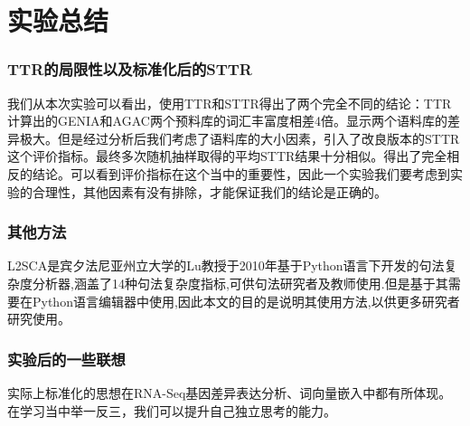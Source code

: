 \documentclass{article}
\begin{document}
\section{实验总结}
\subsubsection{TTR的局限性以及标准化后的STTR}
我们从本次实验可以看出，使用TTR和STTR得出了两个完全不同的结论：TTR计算出的GENIA和AGAC两个预料库的词汇丰富度相差4倍。显示两个语料库的差异极大。但是经过分析后我们考虑了语料库的大小因素，引入了改良版本的STTR这个评价指标。最终多次随机抽样取得的平均STTR结果十分相似。得出了完全相反的结论。可以看到评价指标在这个当中的重要性，因此一个实验我们要考虑到实验的合理性，其他因素有没有排除，才能保证我们的结论是正确的。
\subsubsection{其他方法}
L2SCA是宾夕法尼亚州立大学的Lu教授于2010年基于Python语言下开发的句法复杂度分析器,涵盖了14种句法复杂度指标,可供句法研究者及教师使用.但是基于其需要在Python语言编辑器中使用,因此本文的目的是说明其使用方法,以供更多研究者研究使用。
\subsubsection{实验后的一些联想}
实际上标准化的思想在RNA-Seq基因差异表达分析、词向量嵌入中都有所体现。在学习当中举一反三，我们可以提升自己独立思考的能力。
\end{document}
